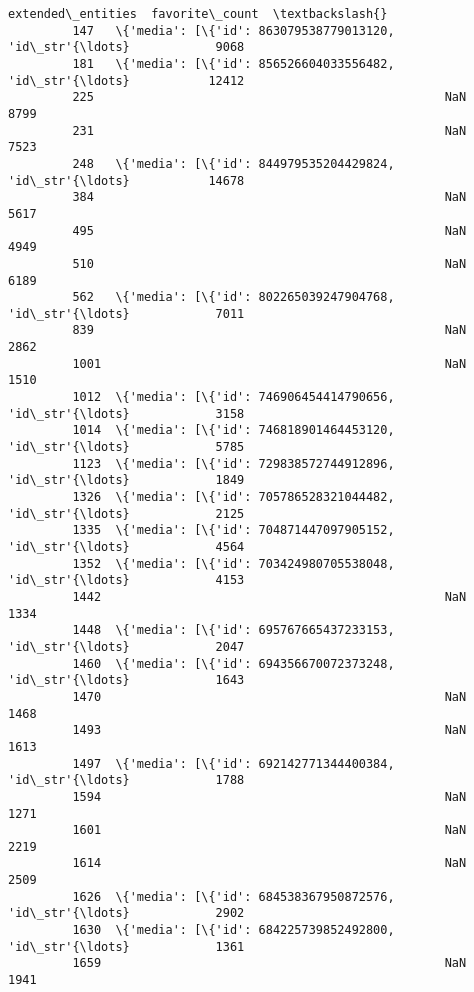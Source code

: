 \documentclass[11pt]{article}
\begin{document}
\begin{Verbatim}[commandchars=\\\{\}]
                                               extended\_entities  favorite\_count  \textbackslash{}
         147   \{'media': [\{'id': 863079538779013120, 'id\_str'{\ldots}            9068   
         181   \{'media': [\{'id': 856526604033556482, 'id\_str'{\ldots}           12412   
         225                                                 NaN            8799   
         231                                                 NaN            7523   
         248   \{'media': [\{'id': 844979535204429824, 'id\_str'{\ldots}           14678   
         384                                                 NaN            5617   
         495                                                 NaN            4949   
         510                                                 NaN            6189   
         562   \{'media': [\{'id': 802265039247904768, 'id\_str'{\ldots}            7011   
         839                                                 NaN            2862   
         1001                                                NaN            1510   
         1012  \{'media': [\{'id': 746906454414790656, 'id\_str'{\ldots}            3158   
         1014  \{'media': [\{'id': 746818901464453120, 'id\_str'{\ldots}            5785   
         1123  \{'media': [\{'id': 729838572744912896, 'id\_str'{\ldots}            1849   
         1326  \{'media': [\{'id': 705786528321044482, 'id\_str'{\ldots}            2125   
         1335  \{'media': [\{'id': 704871447097905152, 'id\_str'{\ldots}            4564   
         1352  \{'media': [\{'id': 703424980705538048, 'id\_str'{\ldots}            4153   
         1442                                                NaN            1334   
         1448  \{'media': [\{'id': 695767665437233153, 'id\_str'{\ldots}            2047   
         1460  \{'media': [\{'id': 694356670072373248, 'id\_str'{\ldots}            1643   
         1470                                                NaN            1468   
         1493                                                NaN            1613   
         1497  \{'media': [\{'id': 692142771344400384, 'id\_str'{\ldots}            1788   
         1594                                                NaN            1271   
         1601                                                NaN            2219   
         1614                                                NaN            2509   
         1626  \{'media': [\{'id': 684538367950872576, 'id\_str'{\ldots}            2902   
         1630  \{'media': [\{'id': 684225739852492800, 'id\_str'{\ldots}            1361   
         1659                                                NaN            1941   

\end{Verbatim}
\end{document}

